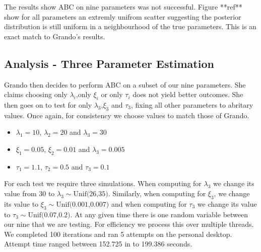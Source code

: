 The results show ABC on nine parameters was not successful. Figure **ref** show for all parameters an extremly unifrom scatter suggesting the posterior distribution is still uniform in a neighbourhood of the true parameters. This is an exact match to Grando's results. 

\subsection{Analysis - Three Parameter Estimation}
Grando then decides to perform ABC on a subset of our nine parameters. She claims choosing only  $\lambda_i$,only $\xi_i$ or only $\tau_i$ does not yield better outcomes. She then goes on to test for only $\lambda_3$,$\xi_3$ and $\tau_3$, fixing all other parameters to abritary values. Once again, for consistency we choose values to match those of Grando.

\begin{itemize}
    \item $\lambda_1 = 10$, $\lambda_2 = 20$ and $\lambda_3 =30$
    \item $\xi_1 = 0.05$, $\xi_2 = 0.01 $ and $\lambda_3 =0.005$
    \item $\tau_1 =1.1$, $\tau_2 = 0.5$ and $\tau_3 =0.1$
\end{itemize}

For each test we require three simulations. When computing for $\lambda_3$ we change its value from 30 to $\lambda_3 \sim \text{Unif(26,35)}$. Similarly, when computing for $\xi_3$, we change its value to $\xi_3 \sim \text{Unif(0.001,0.007)}$ and when computing for $\tau_3$ we change its value to $\tau_3 \sim \text{Unif(0.07,0.2)}$. At any given time there is one random variable between our nine that we are testing. For efficiency we process this over multiple threads. We completed 100 iterations and ran 5 attempts on the personal desktop. Attempt time ranged between 152.725 in to 199.386 seconds.

